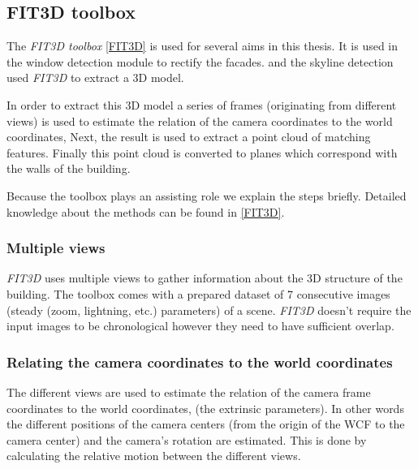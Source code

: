 \subsection{FIT3D toolbox \cite{FIT3D}}
\label{sec:prelimFIT3D}
The \emph{FIT3D toolbox} \ref{FIT3D} is used for several aims in this thesis.
It is used in the window detection module to rectify the facades.
and the skyline detection used \emph{FIT3D} to extract a 3D model.

In order to extract this 3D model a series of frames (originating from different
views) is used to estimate the relation of the camera coordinates to the
world coordinates, Next, the result is used to extract a point cloud of matching
features. Finally this point cloud is converted to planes which correspond with the walls of the building.

Because the toolbox plays an assisting role we explain the steps briefly.
Detailed knowledge about the methods can be found in \ref{FIT3D}.

\subsubsection{Multiple views}
\emph{FIT3D} uses multiple views to gather information about the 3D structure of the
building. The toolbox comes with a prepared dataset of 7 consecutive images (steady (zoom, lightning,
etc.) parameters) of a scene.  \emph{FIT3D} doesn't require the input images to be
chronological however they need to have sufficient overlap. 


\subsubsection{Relating the camera coordinates to the world coordinates}
The different views are used to estimate the relation of the camera frame
coordinates to the world coordinates, (the extrinsic parameters).  In other
words the different positions of the camera centers (from the origin of the WCF
to the camera center) and the camera's rotation are
estimated.  This is done by calculating the relative motion between the
different views.\\

